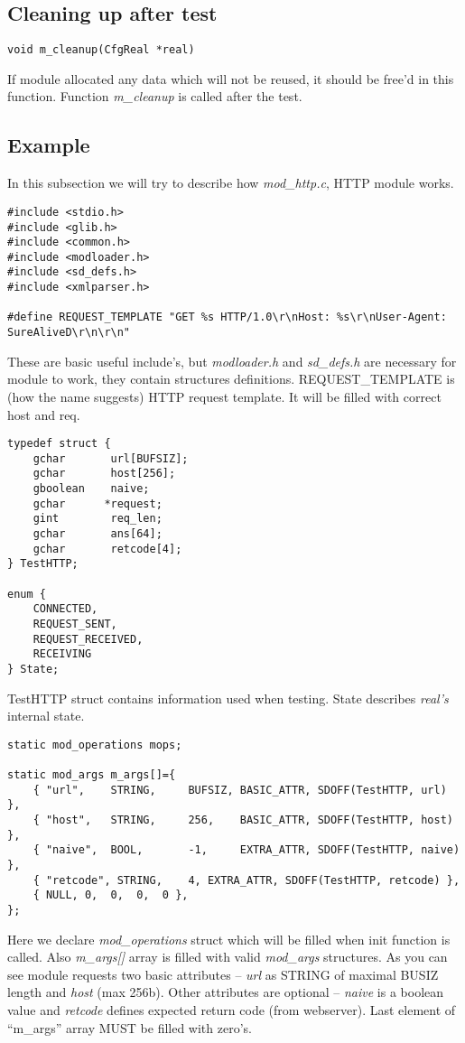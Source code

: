 \documentclass[polish,12pt]{article}
\begin{document}
\subsection{Cleaning up after test}
\begin{verbatim}
void m_cleanup(CfgReal *real)
\end{verbatim}
If module allocated any data which will not be reused, it should be free'd in this function.
Function \textit{m\_cleanup} is called after the test.

\newpage
\subsection{Example}
In this subsection we will try to describe how \textit{mod\_http.c}, HTTP module works.
{\small
\begin{verbatim}
#include <stdio.h>
#include <glib.h>
#include <common.h>
#include <modloader.h>
#include <sd_defs.h>
#include <xmlparser.h>

#define REQUEST_TEMPLATE "GET %s HTTP/1.0\r\nHost: %s\r\nUser-Agent: SureAliveD\r\n\r\n"
\end{verbatim}
}
These are basic useful include's, but \textit{modloader.h} and \textit{sd\_defs.h} are
necessary for module to work, they contain structures definitions.
REQUEST\_TEMPLATE is (how the name suggests) HTTP request template. It will be filled
with correct host and req.
\begin{verbatim}
typedef struct {
    gchar       url[BUFSIZ];
    gchar       host[256];
    gboolean    naive;
    gchar      *request;
    gint        req_len;
    gchar       ans[64];
    gchar       retcode[4];
} TestHTTP;

enum {
    CONNECTED,
    REQUEST_SENT,
    REQUEST_RECEIVED,
    RECEIVING
} State;
\end{verbatim}

TestHTTP struct contains information used when testing.
State describes \textit{real's} internal state.
\newpage
{\small
\begin{verbatim}
static mod_operations mops;

static mod_args m_args[]={
    { "url",    STRING,     BUFSIZ, BASIC_ATTR, SDOFF(TestHTTP, url)    },
    { "host",   STRING,     256,    BASIC_ATTR, SDOFF(TestHTTP, host)   },
    { "naive",  BOOL,       -1,     EXTRA_ATTR, SDOFF(TestHTTP, naive)  },
    { "retcode", STRING,    4, EXTRA_ATTR, SDOFF(TestHTTP, retcode) },
    { NULL, 0,  0,  0,  0 },
};
\end{verbatim}
}
Here we declare \textit{mod\_operations} struct which will be filled when init
function is called.
\newline
Also \textit{m\_args[]} array is filled with valid \textit{mod\_args} structures.
As you can see module requests two basic attributes -- \textit{url} as STRING of maximal
BUSIZ length and \textit{host} (max 256b). Other attributes are optional -- \textit{naive}
is a boolean value and \textit{retcode} defines expected return code (from webserver).
Last element of ``m\_args'' array MUST be filled with zero's.
\end{document}
